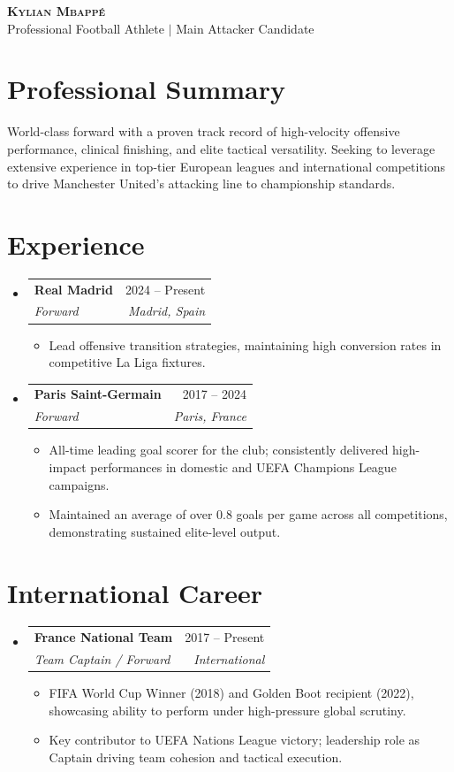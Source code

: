 \documentclass[letterpaper,11pt]{article}
\makeatletter
\newcommand{\resumeItem}[1]{
\item\small{
{#1 \vspace{-2pt}}
}
}
\newcommand{\resumeSubheading}[4]{
\vspace{-2pt}\item
\begin{tabular*}{0.97\textwidth}[t]{l@{\extracolsep{\fill}}r}
\textbf{#1} & #2 \\
\textit{\small#3} & \textit{\small #4} \\
\end{tabular*}\vspace{-7pt}
}
\newcommand{\resumeSubHeadingListStart}{\begin{itemize}[leftmargin=0.15in, label={}]}
\newcommand{\resumeSubHeadingListEnd}{\end{itemize}}
\newcommand{\resumeItemListStart}{\begin{itemize}}
\newcommand{\resumeItemListEnd}{\end{itemize}\vspace{-5pt}}
\makeatother
\begin{document}
\begin{center}
\textbf{\Huge \scshape Kylian Mbappé} \\ \vspace{1pt}
\small Professional Football Athlete $|$ Main Attacker Candidate \\
\end{center}

\section{Professional Summary}
World-class forward with a proven track record of high-velocity offensive performance, clinical finishing, and elite tactical versatility. Seeking to leverage extensive experience in top-tier European leagues and international competitions to drive Manchester United's attacking line to championship standards.

\section{Experience}
\resumeSubHeadingListStart
\resumeSubheading{Real Madrid}{2024 -- Present}{Forward}{Madrid, Spain}
\resumeItemListStart
\resumeItem{Lead offensive transition strategies, maintaining high conversion rates in competitive La Liga fixtures.}
\resumeItemListEnd

\resumeSubheading{Paris Saint-Germain}{2017 -- 2024}{Forward}{Paris, France}
\resumeItemListStart
\resumeItem{All-time leading goal scorer for the club; consistently delivered high-impact performances in domestic and UEFA Champions League campaigns.}
\resumeItem{Maintained an average of over 0.8 goals per game across all competitions, demonstrating sustained elite-level output.}
\resumeItemListEnd
\resumeSubHeadingListEnd

\section{International Career}
\resumeSubHeadingListStart
\resumeSubheading{France National Team}{2017 -- Present}{Team Captain / Forward}{International}
\resumeItemListStart
\resumeItem{FIFA World Cup Winner (2018) and Golden Boot recipient (2022), showcasing ability to perform under high-pressure global scrutiny.}
\resumeItem{Key contributor to UEFA Nations League victory; leadership role as Captain driving team cohesion and tactical execution.}
\resumeItemListEnd
\resumeSubHeadingListEnd
\end{document}
